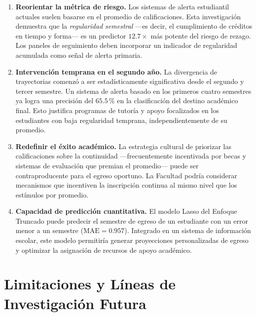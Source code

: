 \begin{enumerate}
    \item \textbf{Reorientar la métrica de riesgo.} Los sistemas de alerta estudiantil actuales
          suelen basarse en el promedio de calificaciones. Esta investigación demuestra que la
          \emph{regularidad semestral} —es decir, el cumplimiento de créditos en tiempo y
          forma— es un predictor $12.7\times$ más potente del riesgo de rezago. Los paneles
          de seguimiento deben incorporar un indicador de regularidad acumulada como señal
          de alerta primaria.

    \item \textbf{Intervención temprana en el segundo año.} La divergencia de trayectorias
          comenzó a ser estadísticamente significativa desde el segundo y tercer semestre.
          Un sistema de alerta basado en los primeros cuatro semestres ya logra una precisión
          del $65.5\,\%$ en la clasificación del destino académico final. Esto justifica
          programas de tutoría y apoyo focalizados en los estudiantes con baja regularidad
          temprana, independientemente de su promedio.

    \item \textbf{Redefinir el éxito académico.} La estrategia cultural de priorizar las
          calificaciones sobre la continuidad —frecuentemente incentivada por becas y sistemas
          de evaluación que premian el promedio— puede ser contraproducente para el egreso
          oportuno. La Facultad podría considerar mecanismos que incentiven la inscripción
          continua al mismo nivel que los estímulos por promedio.

    \item \textbf{Capacidad de predicción cuantitativa.} El modelo Lasso del Enfoque Truncado
          puede predecir el semestre de egreso de un estudiante con un error menor a un semestre
          ($\text{MAE} = 0.957$). Integrado en un sistema de información escolar, este modelo
          permitiría generar proyecciones personalizadas de egreso y optimizar la asignación
          de recursos de apoyo académico.
\end{enumerate}

\section{Limitaciones y Líneas de Investigación Futura}

